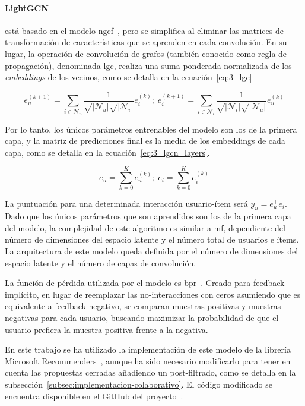 \paragraph{LightGCN}
\label{subsubsec:lightgcn}
está basado en el modelo \acrfull{ngcf}~\cite{wang_neural_2019}, pero se simplifica al eliminar las matrices de transformación de características que se aprenden en cada convolución. En su lugar, la operación de convolución de grafos (también conocido como regla de propagación), denominada \acrfull{lgc}, realiza una suma ponderada normalizada de los \textit{embeddings} de los vecinos, como se detalla en la ecuación~\ref{eq:3_lgc}

\begin{equation}\label{eq:3_lgc}
    e_u^{(k+1)} = \sum_{i\in \mathcal{N}_u} \frac{1}{\sqrt{\left|\mathcal{N}_u\right|}\sqrt{\left|\mathcal{N}_i\right|}} e_i^{(k)};
    \;
    e_i^{(k+1)} = \sum_{i\in \mathcal{N}_i} \frac{1}{\sqrt{\left|\mathcal{N}_i\right|}\sqrt{\left|\mathcal{N}_u\right|}} e_u^{(k)}
\end{equation}

Por lo tanto, los únicos parámetros entrenables del modelo son los de la primera capa, y la matriz de predicciones final es la media de los embeddings de cada capa, como se detalla en la ecuación~\ref{eq:3_lgcn_layers}. 

\begin{equation}\label{eq:3_lgcn_layers}
    e_u = \sum_{k=0}^{K} e_u^{(k)};\;
    e_i = \sum_{k=0}^{K} e_i^{(k)}
\end{equation}

La puntuación para una determinada interacción usuario-ítem será $y_u=e_u^\top e_i$. Dado que los únicos parámetros que son aprendidos son los de la primera capa del modelo, la complejidad de este algoritmo es similar a \gls{mf}, dependiente del número de dimensiones del espacio latente y el número total de usuarios e ítems. La arquitectura de este modelo queda definida por el número de dimensiones del espacio latente y el número de capas de convolución.

La función de pérdida utilizada por el modelo es \acrfull{bpr}~\cite{rendle_bpr_2012}. Creado para feedback implícito, en lugar de reemplazar las no-interacciones con ceros asumiendo que es equivalente a feedback negativo, se comparan muestras positivas y muestras negativas para cada usuario, buscando maximizar la probabilidad de que el usuario prefiera la muestra positiva frente a la negativa.

En este trabajo se ha utilizado la implementación de este modelo de la librería Microsoft Recommenders~\cite{argyriou_microsoft_2020}, aunque ha sido necesario modificarlo para tener en cuenta las propuestas cerradas añadiendo un post-filtrado, como se detalla en la subsección~\ref{subsec:implementacion-colaborativo}. El código modificado se encuentra disponible en el GitHub del proyecto~\cite{davo_daviddavoupm-tfm-notebooks_2024}.

